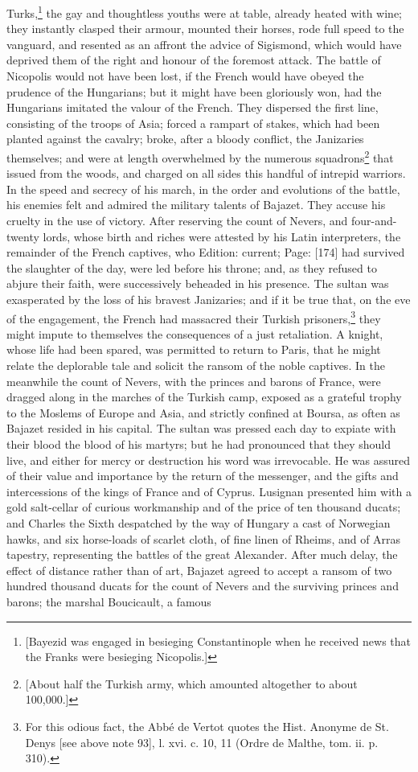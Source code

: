 Turks,\footnote{[Bayezid was engaged in besieging Constantinople when he received news that the Franks were besieging Nicopolis.]} the gay and thoughtless youths were at table, already heated with wine; they instantly clasped their armour, mounted their horses, rode full speed to the vanguard, and resented as an affront the advice of Sigismond, which would have deprived them of the right and honour of the foremost attack. The battle of Nicopolis would not have been lost, if the French would have obeyed the prudence of the Hungarians; but it might have been gloriously won, had the Hungarians imitated the valour of the French. They dispersed the first line, consisting of the troops of Asia; forced a rampart of stakes, which had been planted against the cavalry; broke, after a bloody conflict, the Janizaries themselves; and were at length overwhelmed by the numerous squadrons\footnote{[About half the Turkish army, which amounted altogether to about 100,000.]} that issued from the woods, and charged on all sides this handful of intrepid warriors. In the speed and secrecy of his march, in the order and evolutions of the battle, his enemies felt and admired the military talents of Bajazet. They accuse his cruelty in the use of victory. After reserving the count of Nevers, and four-and-twenty lords, whose birth and riches were attested by his Latin interpreters, the remainder of the French captives, who Edition: current; Page: [174] had survived the slaughter of the day, were led before his throne; and, as they refused to abjure their faith, were successively beheaded in his presence. The sultan was exasperated by the loss of his bravest Janizaries; and if it be true that, on the eve of the engagement, the French had massacred their Turkish prisoners,\footnote{For this odious fact, the Abbé de Vertot quotes the Hist. Anonyme de St. Denys [see above note 93], l. xvi. c. 10, 11 (Ordre de Malthe, tom. ii. p. 310).} they might impute to themselves the consequences of a just retaliation. A knight, whose life had been spared, was permitted to return to Paris, that he might relate the deplorable tale and solicit the ransom of the noble captives. In the meanwhile the count of Nevers, with the princes and barons of France, were dragged along in the marches of the Turkish camp, exposed as a grateful trophy to the Moslems of Europe and Asia, and strictly confined at Boursa, as often as Bajazet resided in his capital. The sultan was pressed each day to expiate with their blood the blood of his martyrs; but he had pronounced that they should live, and either for mercy or destruction his word was irrevocable. He was assured of their value and importance by the return of the messenger, and the gifts and intercessions of the kings of France and of Cyprus. Lusignan presented him with a gold salt-cellar of curious workmanship and of the price of ten thousand ducats; and Charles the Sixth despatched by the way of Hungary a cast of Norwegian hawks, and six horse-loads of scarlet cloth, of fine linen of Rheims, and of Arras tapestry, representing the battles of the great Alexander. After much delay, the effect of distance rather than of art, Bajazet agreed to accept a ransom of two hundred thousand ducats for the count of Nevers and the surviving princes and barons; the marshal Boucicault, a famous 